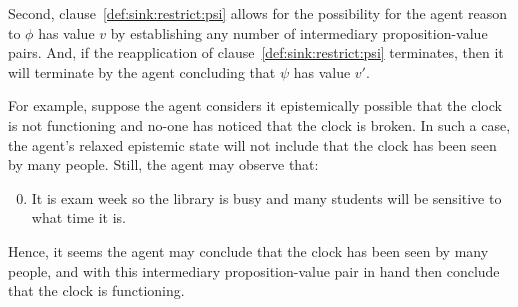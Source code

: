 \begin{note}[Option 2]
  Second, clause~\ref{def:sink:restrict:psi} allows for the possibility for the agent reason to \(\phi\) has value \(v\) by establishing any number of intermediary proposition-value pairs.
  And, if the reapplication of clause~\ref{def:sink:restrict:psi} terminates, then it will terminate by the agent concluding that \(\psi\) has value \(v'\).

  For example, suppose the agent considers it epistemically possible that the clock is not functioning and no-one has noticed that the clock is broken.
  In such a case, the agent's relaxed epistemic state will not include that the clock has been seen by many people.
  Still, the agent may observe that:
  \begin{enumerate}
    \setcounter{enumi}{-1}
  \item It is exam week so the library is busy and many students will be sensitive to what time it is.
  \end{enumerate}
  Hence, it seems the agent may conclude that the clock has been seen by many people, and with this intermediary proposition-value pair in hand then conclude that the clock is functioning.
\end{note}

